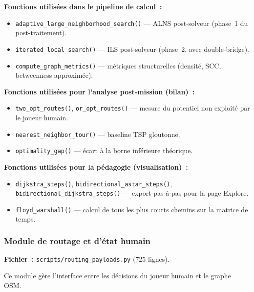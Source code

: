\documentclass[a4paper, 12pt, twoside]{article}
\begin{document}
\textbf{Fonctions utilis\'{e}es dans le pipeline de calcul~:}
\begin{itemize}
  \item \texttt{adaptive\_large\_neighborhood\_search()} --- ALNS post-solveur (phase~1 du post-traitement).
  \item \texttt{iterated\_local\_search()} --- ILS post-solveur (phase~2, avec double-bridge).
  \item \texttt{compute\_graph\_metrics()} --- m\'{e}triques structurelles (densit\'{e}, SCC, betweenness approxim\'{e}e).
\end{itemize}

\textbf{Fonctions utilis\'{e}es pour l'analyse post-mission (bilan)~:}
\begin{itemize}
  \item \texttt{two\_opt\_routes()}, \texttt{or\_opt\_routes()} --- mesure du potentiel non exploit\'{e} par le joueur humain.
  \item \texttt{nearest\_neighbor\_tour()} --- baseline TSP gloutonne.
  \item \texttt{optimality\_gap()} --- \'{e}cart \`{a} la borne inf\'{e}rieure th\'{e}orique.
\end{itemize}

\textbf{Fonctions utilis\'{e}es pour la p\'{e}dagogie (visualisation)~:}
\begin{itemize}
  \item \texttt{dijkstra\_steps()}, \texttt{bidirectional\_astar\_steps()}, \texttt{bidirectional\_dijkstra\_steps()} --- export pas-\`{a}-pas pour la page Explore.
  \item \texttt{floyd\_warshall()} --- calcul de tous les plus courts chemins sur la matrice de temps.
\end{itemize}

\subsubsection{Module de routage et d'\'{e}tat humain}

\textbf{Fichier~:} \texttt{scripts/routing\_payloads.py} (725 lignes).

Ce module g\`{e}re l'interface entre les d\'{e}cisions du joueur humain et le graphe OSM.
\end{document}
